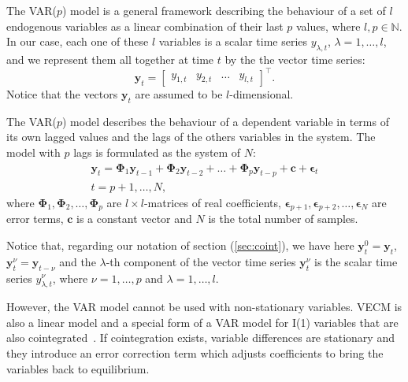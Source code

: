 The VAR($p$) model is a general framework describing the behaviour of a
set of $l$ endogenous variables as a linear combination of their last $p$
values, where $l,p\in\mathbb{N}$. 
In our case, each one of these $l$ variables is a scalar time series
$y_{\lambda,t}$, $\lambda=1,\dots,l$, and we represent them all together
at time $t$ by the the vector time series:
\begin{equation}
\label{eq:variables}
\mathbf{y}_t = 
\begin{bmatrix} y_{1,t} & y_{2,t} & \dots & y_{l,t} \end{bmatrix}^\top.
\end{equation}
\noindent
Notice that the vectors $\mathbf{y}_t$ are assumed to be $l$-dimensional.

The VAR($p$) model describes the behaviour of a dependent variable in terms of
its own lagged values and the lags of the others variables in the system. The
model with $p$ lags is formulated as the system of $N$:
\begin{align}
\label{eq:var}
\mathbf{y}_t 
= \boldsymbol{\Phi}_1 \mathbf{y}_{t-1} +
  \boldsymbol{\Phi}_2 \mathbf{y}_{t-2} + \dots +
  \boldsymbol{\Phi}_p\mathbf{y}_{t-p} +
  \mathbf{c} + \boldsymbol{\epsilon}_t \nonumber \\
t=p+1,\dots,N,
\end{align}
\noindent where 
$\boldsymbol{\Phi}_1, \boldsymbol{\Phi}_2,\dots,\boldsymbol{\Phi}_p$
are $l\times l$-matrices of real coefficients,
$\boldsymbol{\epsilon}_{p+1},
 \boldsymbol{\epsilon}_{p+2}, \dots, \boldsymbol{\epsilon}_N$ 
are error terms, $\mathbf{c}$ is a constant vector and $N$ is the total
number of samples.

Notice that, regarding our notation of section (\ref{sec:coint}),
we have here 
$\mathbf{y}_t^0 = \mathbf{y}_t$,
$\mathbf{y}_t^\nu = \mathbf{y}_{t-\nu}$ and
the $\lambda$-th component of the vector time series $\mathbf{y}_t^\nu$
is the scalar time series $y_{\lambda,t}^\nu$, where $\nu=1,\dots,p$ and
$\lambda=1,\dots,l$.

However, the VAR model cannot be used with non-stationary variables. VECM \cite{engle87} is also a linear model and a special form of a VAR model for I(1) variables that are also
cointegrated~\cite{banerjee1993}. If cointegration exists, variable differences
are stationary and they introduce an error correction term which adjusts
coefficients to bring the variables back to equilibrium. 


